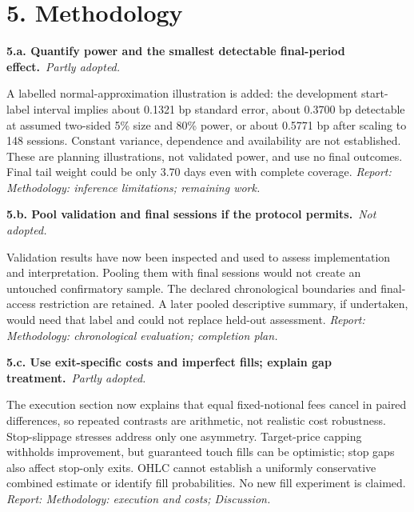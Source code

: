 \documentclass[11pt,a4paper]{article}
\newcommand{\Needspace}[1]{\par\begingroup\ifdim\dimexpr\pagegoal-\pagetotal\relax<#1\relax\newpage\fi\endgroup}
\newcommand{\reply}[3]{\par\addvspace{5pt}\noindent\textbf{#1. #2}\ \textit{#3.}\par\nobreak}
\begin{document}
\Needspace{10\baselineskip}
\section*{5. Methodology}
\par\noindent\begin{minipage}{\linewidth}\justifying
\reply{5.a}{Quantify power and the smallest detectable final-period effect.}{Partly adopted}
A labelled normal-approximation illustration is added: the development start-label interval implies about 0.1321 bp standard error, about 0.3700 bp detectable at assumed two-sided 5\% size and 80\% power, or about 0.5771 bp after scaling to 148 sessions. Constant variance, dependence and availability are not established. These are planning illustrations, not validated power, and use no final outcomes. Final tail weight could be only 3.70 days even with complete coverage.
{\small\textit{Report: Methodology: inference limitations; remaining work.}}
\end{minipage}\par\addvspace{5pt}

\par\noindent\begin{minipage}{\linewidth}\justifying
\reply{5.b}{Pool validation and final sessions if the protocol permits.}{Not adopted}
Validation results have now been inspected and used to assess implementation and interpretation. Pooling them with final sessions would not create an untouched confirmatory sample. The declared chronological boundaries and final-access restriction are retained. A later pooled descriptive summary, if undertaken, would need that label and could not replace held-out assessment.
{\small\textit{Report: Methodology: chronological evaluation; completion plan.}}
\end{minipage}\par\addvspace{5pt}

\par\noindent\begin{minipage}{\linewidth}\justifying
\reply{5.c}{Use exit-specific costs and imperfect fills; explain gap treatment.}{Partly adopted}
The execution section now explains that equal fixed-notional fees cancel in paired differences, so repeated contrasts are arithmetic, not realistic cost robustness. Stop-slippage stresses address only one asymmetry. Target-price capping withholds improvement, but guaranteed touch fills can be optimistic; stop gaps also affect stop-only exits. OHLC cannot establish a uniformly conservative combined estimate or identify fill probabilities. No new fill experiment is claimed.
{\small\textit{Report: Methodology: execution and costs; Discussion.}}
\end{minipage}\par\addvspace{5pt}
\end{document}
